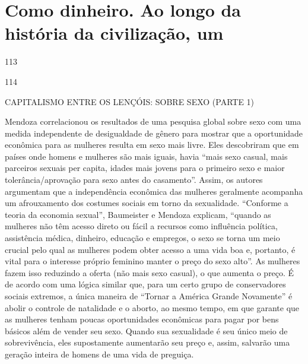 \section{Como dinheiro. Ao longo da história da civilização, um}
 \par 
113
 \par 
114
 \par 
CAPITALISMO ENTRE OS LENÇÓIS: SOBRE SEXO (PARTE {\color{blue}1})
 \par 
Mendoza correlacionou os resultados de uma pesquisa global sobre sexo com uma medida independente de desigualdade de gênero para mostrar que a oportunidade econômica para as mulheres resulta em sexo mais livre. Eles descobriram que em países onde homens e mulheres são mais iguais, havia “mais sexo casual, mais parceiros sexuais per capita, idades mais jovens para o primeiro sexo e maior tolerância/aprovação para sexo antes do casamento”. Assim, os autores argumentam que a independência econômica das mulheres geralmente acompanha um afrouxamento dos costumes sociais em torno da sexualidade. “Conforme a teoria da economia sexual”, Baumeister e Mendoza explicam, “quando as mulheres não têm acesso direto ou fácil a recursos como influência política, assistência médica, dinheiro, educação e empregos, o sexo se torna um meio crucial pelo qual as mulheres podem obter acesso a uma vida boa e, portanto, é vital para o interesse próprio feminino manter o preço do sexo alto”. As mulheres fazem isso reduzindo a oferta (não mais sexo casual), o que aumenta o preço. É de acordo com uma lógica similar que, para um certo grupo de conservadores sociais extremos, a única maneira de “Tornar a América Grande Novamente” é abolir o controle de natalidade e o aborto, ao mesmo tempo, em que garante que as mulheres tenham poucas oportunidades econômicas para pagar por bens básicos além de vender seu sexo. Quando sua sexualidade é seu único meio de sobrevivência, eles supostamente aumentarão seu preço e, assim, salvarão uma geração inteira de homens de uma vida de preguiça.
 \par 

